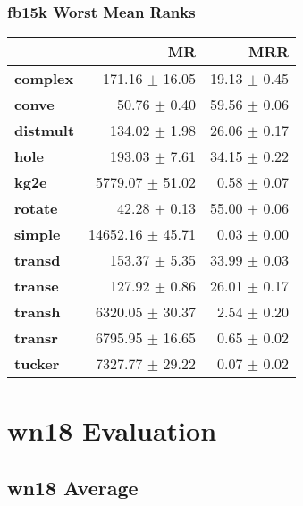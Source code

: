 \documentclass{article}
\begin{document}
\subsubsection{fb15k Worst Mean Ranks}
    \begin{center}
    \begin{tabular}{lrr}
\toprule
{} &                MR &           MRR \\
\midrule
\textbf{complex } &    171.16 $\pm$ 16.05 &  19.13 $\pm$ 0.45 \\
\textbf{conve   } &      50.76 $\pm$ 0.40 &  59.56 $\pm$ 0.06 \\
\textbf{distmult} &     134.02 $\pm$ 1.98 &  26.06 $\pm$ 0.17 \\
\textbf{hole    } &     193.03 $\pm$ 7.61 &  34.15 $\pm$ 0.22 \\
\textbf{kg2e    } &   5779.07 $\pm$ 51.02 &   0.58 $\pm$ 0.07 \\
\textbf{rotate  } &      42.28 $\pm$ 0.13 &  55.00 $\pm$ 0.06 \\
\textbf{simple  } &  14652.16 $\pm$ 45.71 &   0.03 $\pm$ 0.00 \\
\textbf{transd  } &     153.37 $\pm$ 5.35 &  33.99 $\pm$ 0.03 \\
\textbf{transe  } &     127.92 $\pm$ 0.86 &  26.01 $\pm$ 0.17 \\
\textbf{transh  } &   6320.05 $\pm$ 30.37 &   2.54 $\pm$ 0.20 \\
\textbf{transr  } &   6795.95 $\pm$ 16.65 &   0.65 $\pm$ 0.02 \\
\textbf{tucker  } &   7327.77 $\pm$ 29.22 &   0.07 $\pm$ 0.02 \\
\bottomrule
\end{tabular}

    \end{center}

\section{wn18 Evaluation}
\subsection{wn18 Average}
\end{document}
